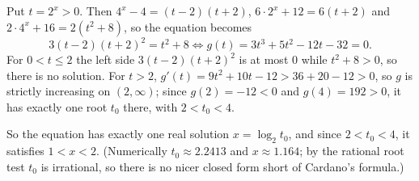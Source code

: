 Put $t=2^x>0$. Then $4^x-4=(t-2)(t+2)$, $6\cdot2^x+12=6(t+2)$ and $2\cdot4^x+16=2(t^2+8)$, so the equation becomes
\[
3(t-2)(t+2)^2=t^2+8\iff g(t)=3t^3+5t^2-12t-32=0 .
\]
For $0<t\le2$ the left side $3(t-2)(t+2)^2$ is at most $0$ while $t^2+8>0$, so there is no solution. For $t>2$, $g'(t)=9t^2+10t-12>36+20-12>0$, so $g$ is strictly increasing on $(2,\infty)$; since $g(2)=-12<0$ and $g(4)=192>0$, it has exactly one root $t_0$ there, with $2<t_0<4$.

So the equation has exactly $\boxed{\text{one}}$ real solution $x=\log_2t_0$, and since $2<t_0<4$, it satisfies $\boxed{1<x<2}$. (Numerically $t_0\approx2.2413$ and $x\approx1.164$; by the rational root test $t_0$ is irrational, so there is no nicer closed form short of Cardano's formula.)
